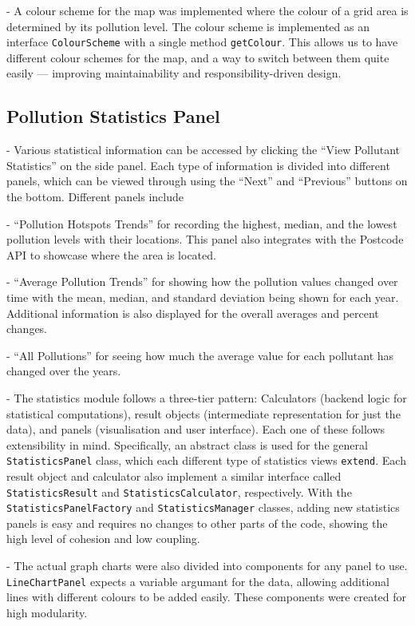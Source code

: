     - A colour scheme for the map was implemented where the colour of a grid area is determined by its pollution level. The colour scheme is implemented as an interface \verb|ColourScheme| with a single method \verb|getColour|. This allows us to have different colour schemes for the map, and a way to switch between them quite easily — improving maintainability and responsibility-driven design.

\subsection{Pollution Statistics Panel}
    - Various statistical information can be accessed by clicking the “View Pollutant Statistics” on the side panel. Each type of information is divided into different panels, which can be viewed through using the “Next” and “Previous” buttons on the bottom. Different panels include
    
    - “Pollution Hotspots Trends” for recording the highest, median, and the lowest pollution levels with their locations. This panel also integrates with the Postcode API to showcase where the area is located.
    
    - “Average Pollution Trends” for showing how the pollution values changed over time with the mean, median, and standard deviation being shown for each year. Additional information is also displayed for the overall averages and percent changes.
    
    - “All Pollutions” for seeing how much the average value for each pollutant has changed over the years.
    
    - The statistics module follows a three-tier pattern: Calculators (backend logic for statistical computations), result objects (intermediate representation for just the data), and panels (visualisation and user interface). Each one of these follows extensibility in mind. Specifically, an abstract class is used for the general \verb|StatisticsPanel| class, which each different type of statistics views \verb|extend|. Each result object and calculator also implement a similar interface called \verb|StatisticsResult| and \verb|StatisticsCalculator|, respectively. With the \verb|StatisticsPanelFactory| and \verb|StatisticsManager| classes, adding new statistics panels is easy and requires no changes to other parts of the code, showing the high level of cohesion and low coupling.
    
    - The actual graph charts were also divided into components for any panel to use. \verb|LineChartPanel| expects a variable argumant for the data, allowing additional lines with different colours to be added easily. These components were created for high modularity.
    

